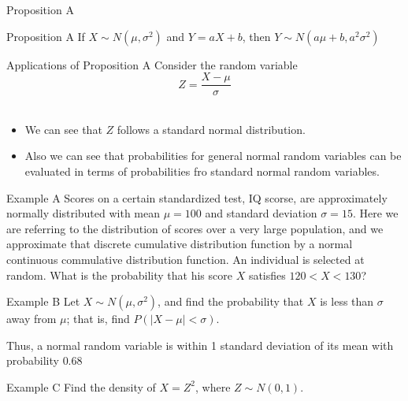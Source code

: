 \documentclass{beamer}
\begin{document}
\begin{frame}{Proposition A}
\begin{block}{Proposition A}    
If \(X \sim N(\mu, \sigma^2)\) and \(Y=aX+b\), then \(Y\sim N(a\mu +b, a^2\sigma^2)\)
\end{block}
\end{frame}

\begin{frame}{Applications of Proposition A}
Consider the random variable \[Z=\dfrac{X-\mu}{\sigma}\]\\ \pause 


\begin{itemize}
    \item We can see that \(Z\) follows a standard normal distribution. \\\pause


    \item Also we can see that probabilities for general normal random variables can be evaluated in terms of probabilities fro standard normal random variables. 
\end{itemize} 
\end{frame}


\begin{frame}{Example A}
Scores on a certain standardized test, IQ scorse, are approximately normally distributed with mean \(\mu =100\) and standard deviation \(\sigma=15\). Here we are referring to the distribution of scores over a very large population, and we approximate that discrete cumulative distribution function by a normal continuous commulative distribution function. An individual is selected at random. What is the probability that his score \(X\) satisfies \(120 <X< 130\)?   
\end{frame}

\begin{frame}{Example B}
Let \(X \sim N (\mu, \sigma^2)\), and find the probability that \(X\) is less than \(\sigma\) away from \(\mu\); that is, find \(P(|X-\mu|< \sigma)\).\\ \pause
\vspace{0.2in}

Thus, a normal random variable is within 1 standard deviation of its mean with probability \(0.68\)
\end{frame}

\begin{frame}{Example C}
    Find the density of \(X=Z^2\), where \(Z \sim N(0,1)\). \\
    \vspace{0.2in}

\end{frame}
\end{document}
